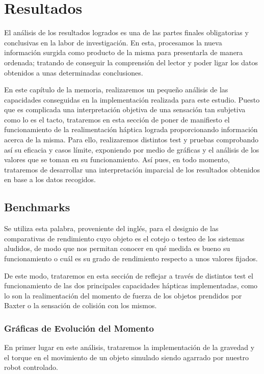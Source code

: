 \chapter{Resultados}
El análisis de los resultados logrados es una de las partes finales obligatorias y conclusivas en la labor de investigación. En esta, procesamos la nueva información surgida como producto de la misma para presentarla de manera ordenada; tratando de conseguir la comprensión del lector y poder ligar los datos obtenidos a unas determinadas conclusiones.

En este capítulo de la memoria, realizaremos un pequeño análisis de las capacidades conseguidas en la implementación realizada para este estudio. Puesto que es complicada una interpretación objetiva de  una sensación tan subjetiva como lo es el tacto, trataremos en esta sección de poner de manifiesto el funcionamiento de la realimentación háptica lograda proporcionando información acerca de la misma. Para ello, realizaremos distintos test y pruebas comprobando así su eficacia y casos límite, exponiendo por medio de gráficas y el análisis de los valores que se toman en su funcionamiento. Así pues, en todo momento, trataremos de desarrollar una interpretación imparcial de los resultados obtenidos en base a los datos recogidos. 


\bigskip
\bigskip
\bigskip
\bigskip
\bigskip
\bigskip
\bigskip
\bigskip
\bigskip
\bigskip
\bigskip

\section{Benchmarks}
Se utiliza esta palabra, proveniente del inglés, para el designio de las comparativas de rendimiento cuyo objeto es el cotejo o testeo de los sistemas aludidos, de modo que nos permitan conocer en qué medida es bueno su funcionamiento o cuál es su grado de rendimiento respecto a unos valores fijados. 

De este modo, trataremos en esta sección de reflejar a través de distintos test el funcionamiento de las dos principales capacidades hápticas implementadas, como lo son la realimentación del momento de fuerza de los objetos prendidos por Baxter o la sensación de colisión con los mismos. 

\subsection{Gráficas de Evolución del Momento}
En primer lugar en este análisis, trataremos la implementación de la gravedad y el torque en el movimiento de un objeto simulado siendo agarrado por nuestro robot controlado. 

